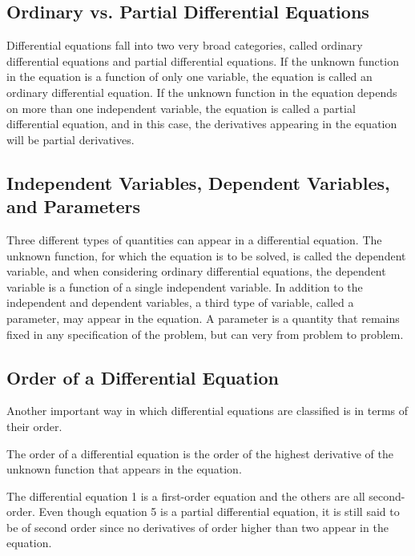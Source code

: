   \subsection{Ordinary vs. Partial Differential Equations}

    Differential equations fall into two very broad categories, called ordinary differential equations and partial differential equations. If the unknown function in the equation is a function of only one variable, the equation is called an ordinary differential equation. If the unknown function in the equation depends on more than one independent variable, the equation is called a partial differential equation, and in this case, the derivatives appearing in the equation will be partial derivatives.

  \subsection{Independent Variables, Dependent Variables, and Parameters}

   Three different types of quantities can appear in a differential equation. The unknown function, for which the equation is to be solved, is called the dependent variable, and when considering ordinary differential equations, the dependent variable is a function of a single independent variable. In addition to the independent and dependent variables, a third type of variable, called a parameter, may appear in the equation. A parameter is a quantity that remains fixed in any specification of the problem, but can very from problem to problem.
  
  \subsection{Order of a Differential Equation}

    Another important way in which differential equations are classified is in terms of their order.

    \begin{definition}
      The order of a differential equation is the order of the highest derivative of the unknown function that appears in the equation.
    \end{definition}

    The differential equation 1 is a first-order equation and the others are all second-order. Even though equation 5 is a partial differential equation, it is still said to be of second order since no derivatives of order higher than two appear in the equation.

